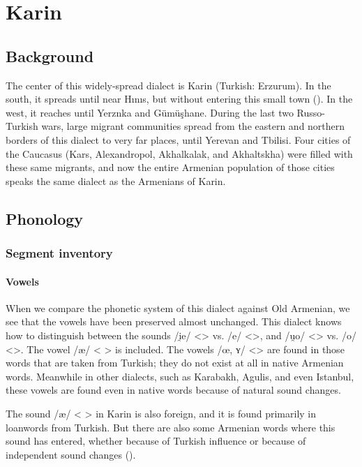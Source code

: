 \chapter{Karin}\label{chapter:Karin}
\section{Background}
\begin{adjarianpage}\label{page:104}\end{adjarianpage}%


The center of this widely-spread dialect is Karin (Turkish: Erzurum). In the south, it spreads until near Hınıs, but without entering this small town (). In the west, it reaches until Yerznka and Gümüşhane. During the last two Russo-Turkish wars, large migrant communities spread from the eastern and northern borders of this dialect to very far places, until Yerevan and Tbilisi. Four cities of the Caucasus (Kars, Alexandropol, Akhalkalak, and Akhaltskha) were filled with these same migrants, and now the entire Armenian population of those cities speaks the same dialect as the Armenians of Karin. 

\section{Phonology}

\subsection{Segment inventory}

\subsubsection{Vowels}
When we compare the phonetic system of this dialect against Old Armenian, we see that the vowels have been preserved almost unchanged. This dialect knows how to distinguish between the sounds /i̯e/ <> vs. /e/ <>, and /u̯o/ <> vs. /o/ <>. The vowel /æ/ < > is included. The vowels /œ, ʏ/ <> are found in those words that are taken from Turkish; they do not exist at all in native Armenian words. Meanwhile in other dialects, such as Karabakh, Agulis, and even Istanbul, these vowels are found even in native words because of natural sound changes.

The sound /æ/ < > in Karin is also foreign, and it is found primarily in loanwords from Turkish. But there are also some Armenian words where this sound has entered, whether because of Turkish influence or because of independent sound changes ().

